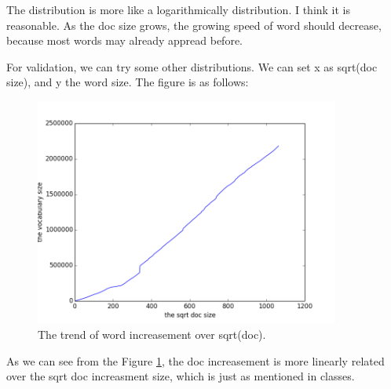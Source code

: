 \documentclass{article} %
\begin{document}
The distribution is more like a logarithmically distribution. I think it is
reasonable. As the doc size grows, the growing speed of word should decrease,
because most words may already appread before.

For validation, we can try some other distributions. We can set x as sqrt(doc
size), and y the word size. The figure is as follows:

\begin{figure}[h]
\begin{center}
\includegraphics[width=100mm]{pic/sqrtdoc_word.png}
\end{center}
\caption{The trend of word increasement over sqrt(doc).}
\label{fig:sqrtdoc_word}
\end{figure}

As we can see from the Figure \ref{fig:sqrtdoc_word}, the doc increasement is
more linearly related over the sqrt doc increasment size, which is just as
mentioned in classes.
\end{document}
